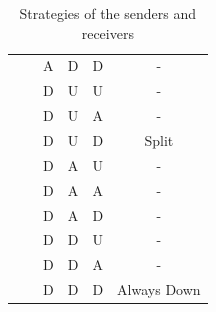 \documentclass[a4paper,10pt]{article}
\numberwithin{equation}{section}
\begin{document}
\begin{table}[h]
\begin{center}
\begin{tabular}{c|c|ccc|c|c|c}
\multicolumn{3}{c}{}&&A&D&D&-\\
\multicolumn{3}{c}{}&&D&U&U&-\\
\multicolumn{3}{c}{}&&D&U&A&-\\
\multicolumn{3}{c}{}&&D&U&D&Split\\
\multicolumn{3}{c}{}&&D&A&U&-\\
\multicolumn{3}{c}{}&&D&A&A&-\\
\multicolumn{3}{c}{}&&D&A&D&-\\
\multicolumn{3}{c}{}&&D&D&U&-\\
\multicolumn{3}{c}{}&&D&D&A&-\\
\multicolumn{3}{c}{}&&D&D&D&Always Down\\
\end{tabular}
\end{center}
\caption{Strategies of the senders and receivers}
\label{tab:StrategiesRevelationFull}
\end{table}
\end{document}
